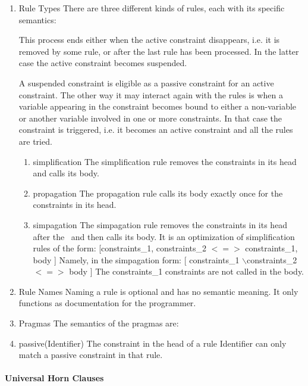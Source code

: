 \documentclass[thesis-solanki.tex]{subfiles}
\begin{document}
\begin{enumerate}

\item Rule Types There are three different kinds of rules, each with its specific semantics:

This process ends either when the active constraint disappears, i.e.\yyy{}{\Large,} it is removed by some rule, or
after the last rule has been processed.
In the latter case the active constraint becomes suspended.

A suspended constraint is eligible as a passive constraint for an active constraint.
The other way it may interact again with the rules is when a variable appearing in the constraint becomes bound to
either a non-variable or another variable involved in one or more constraints.
In that case the constraint is triggered, i.e.\yyy{}{\Large,}
it becomes an active constraint and all the rules are tried.
\begin{enumerate}

\item simplification
The simplification rule removes the constraints in its head and calls its body.

\item propagation
The propagation rule calls its body exactly once for the constraints in its head.

\item simpagation
The simpagation rule removes the constraints in its head after the \ and then calls its body. It is an optimization of simplification rules 
of the form: [constraints\_1, constraints\_2 $<=>$ constraints\_1, body ] Namely, in the simpagation form: [ constraints\_1 
$\backslash$constraints\_2 $<=>$ body ] The constraints\_1 constraints are not called in the body.

\end{enumerate}


\item Rule Names Naming a rule is optional and has no semantic meaning. It only functions as documentation for the programmer.

\item Pragmas The semantics of the pragmas are:

\item passive(Identifier)
The constraint in the head of a rule Identifier can only match a passive constraint in that rule. 

\end{enumerate}

\paragraph{Universal Horn Clauses}
\end{document}
